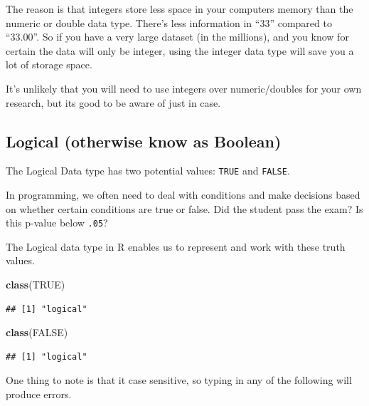 \documentclass[
]{book}
\newenvironment{Shaded}{\begin{snugshade}}{\end{snugshade}}
\newcommand{\ConstantTok}[1]{\textcolor[rgb]{0.56,0.35,0.01}{#1}}
\newcommand{\FunctionTok}[1]{\textcolor[rgb]{0.13,0.29,0.53}{\textbf{#1}}}
\newcommand{\NormalTok}[1]{#1}
\begin{document}
The reason is that integers store less space in your computers memory than the numeric or double data type. There's less information in ``33'' compared to ``33.00''. So if you have a very large dataset (in the millions), and you know for certain the data will only be integer, using the integer data type will save you a lot of storage space.

It's unlikely that you will need to use integers over numeric/doubles for your own research, but its good to be aware of just in case.

\hypertarget{logical-otherwise-know-as-boolean}{%
\subsection{Logical (otherwise know as Boolean)}\label{logical-otherwise-know-as-boolean}}

The Logical Data type has two potential values: \texttt{TRUE} and \texttt{FALSE}.

In programming, we often need to deal with conditions and make decisions based on whether certain conditions are true or false. Did the student pass the exam? Is this p-value below \texttt{.05}?

The Logical data type in R enables us to represent and work with these truth values.

\begin{Shaded}
\begin{Highlighting}[]
\FunctionTok{class}\NormalTok{(}\ConstantTok{TRUE}\NormalTok{)}
\end{Highlighting}
\end{Shaded}

\begin{verbatim}
## [1] "logical"
\end{verbatim}

\begin{Shaded}
\begin{Highlighting}[]
\FunctionTok{class}\NormalTok{(}\ConstantTok{FALSE}\NormalTok{)}
\end{Highlighting}
\end{Shaded}

\begin{verbatim}
## [1] "logical"
\end{verbatim}

One thing to note is that it case sensitive, so typing in any of the following will produce errors.
\end{document}
